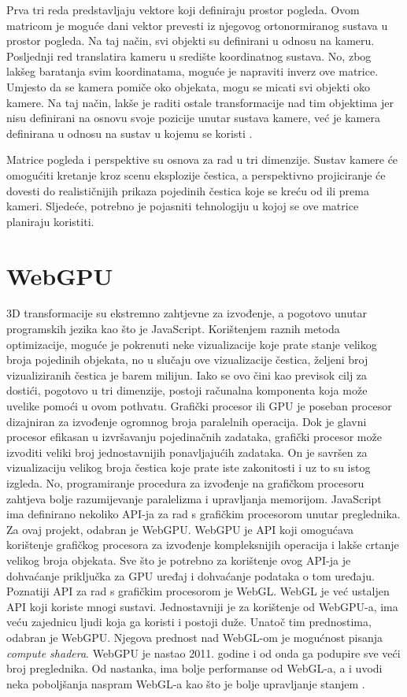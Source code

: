 \documentclass{foi}
\begin{document}
Prva tri reda predstavljaju vektore koji definiraju prostor pogleda. Ovom matricom je moguće dani vektor prevesti iz njegovog ortonormiranog sustava u prostor pogleda. Na taj način, svi objekti su definirani u odnosu na kameru. Posljednji red translatira kameru u središte koordinatnog sustava. No, zbog lakšeg baratanja svim koordinatama, moguće je napraviti inverz ove matrice. Umjesto da se kamera pomiče oko objekata, mogu se micati svi objekti oko kamere. Na taj način, lakše je raditi ostale transformacije nad tim objektima jer nisu definirani na osnovu svoje pozicije unutar sustava kamere, već je kamera definirana u odnosu na sustav u kojemu se koristi \parencite{KameraBezDat}.

Matrice pogleda i perspektive su osnova za rad u tri dimenzije. Sustav kamere će omogućiti kretanje kroz scenu eksplozije čestica, a perspektivno projiciranje će dovesti do realističnijih prikaza pojedinih čestica koje se kreću od ili prema kameri. Sljedeće, potrebno je pojasniti tehnologiju u kojoj se ove matrice planiraju koristiti.

\section{WebGPU}
3D transformacije su ekstremno zahtjevne za izvođenje, a pogotovo unutar programskih jezika kao što je JavaScript. Korištenjem raznih metoda optimizacije, moguće je pokrenuti neke vizualizacije koje prate stanje velikog broja pojedinih objekata, no u slučaju ove vizualizacije čestica, željeni broj vizualiziranih čestica je barem milijun. Iako se ovo čini kao previsok cilj za dostići, pogotovo u tri dimenzije, postoji računalna komponenta koja može uvelike pomoći u ovom pothvatu. Grafički procesor ili GPU je poseban procesor dizajniran za izvođenje ogromnog broja paralelnih operacija. Dok je glavni procesor efikasan u izvršavanju pojedinačnih zadataka, grafički procesor može izvoditi veliki broj jednostavnijih ponavljajućih zadataka. On je savršen za vizualizaciju velikog broja čestica koje prate iste zakonitosti i uz to su istog izgleda. No, programiranje procedura za izvođenje na grafičkom procesoru zahtjeva bolje razumijevanje paralelizma i upravljanja memorijom. JavaScript ima definirano nekoliko API-ja za rad s grafičkim procesorom unutar preglednika. Za ovaj projekt, odabran je WebGPU.  WebGPU je API koji omogućava korištenje grafičkog procesora za izvođenje kompleksnijih operacija i lakše crtanje velikog broja objekata. Sve što je potrebno za korištenje ovog API-ja je dohvaćanje priključka za GPU uređaj i dohvaćanje podataka o tom uređaju. Poznatiji API za rad s grafičkim procesorom je WebGL. WebGL je već ustaljen API koji koriste mnogi sustavi. Jednostavniji je za korištenje od WebGPU-a, ima veću zajednicu ljudi koja ga koristi i postoji duže. Unatoč tim prednostima, odabran je WebGPU. Njegova prednost nad WebGL-om je mogućnost pisanja \textit{compute shadera}. WebGPU je nastao 2011. godine i od onda ga podupire sve veći broj preglednika. Od nastanka, ima bolje performanse od WebGL-a, a i uvodi neka poboljšanja naspram WebGL-a kao što je bolje upravljanje stanjem \parencite{DocWebGPU}. 
\end{document}
